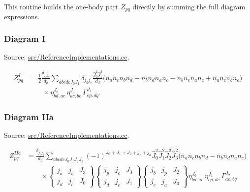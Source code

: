 \documentclass[
]{article}
\begin{document}
This routine builds the one-body part \(Z_{pq}\) directly by summing the
full diagram expressions.

\subsubsection{Diagram I}\label{diagram-i}

Source:
\href{../src/ReferenceImplementations.cc\#L6631-L6725}{src/ReferenceImplementations.cc}.

\begin{equation}
\begin{aligned}
Z^{I}_{pq}
&= \frac{1}{2}\frac{\delta_{j_p j_q}}{d_p}
\sum_{abcdeJ_0J_1}\delta_{j_dj_e}
\frac{\hat J_0^2\hat J_1^2}{d_d}
\Big(
\bar n_a\bar n_c n_b n_d
-\bar n_b\bar n_d n_a n_c
-\bar n_b\bar n_e n_a n_c
+\bar n_a\bar n_c n_b n_e
\Big) \\
&\qquad\times
\eta^{J_0}_{bd,ac}\,
\eta^{J_0}_{ac,be}\,
\Gamma^{J_1}_{ep,dq} .
\end{aligned}
\end{equation}

\subsubsection{Diagram IIa}\label{diagram-iia}

Source:
\href{../src/ReferenceImplementations.cc\#L6731-L6847}{src/ReferenceImplementations.cc}.

\begin{equation}
\begin{aligned}
Z^{IIa}_{pq}
&=\frac{\delta_{j_pj_q}}{d_p}
\sum_{abcdeJ_0J_1J_2J_3}
(-1)^{J_0+J_1+J_2+j_c+j_d}
\hat J_0^2\hat J_1^2\hat J_2^2\hat J_3^2
\Big(\bar n_a\bar n_c n_b n_d-\bar n_b\bar n_d n_a n_c\Big) \\
&\qquad\times
\begin{Bmatrix} j_a&j_b&J_3\\ j_d&j_c&J_0\end{Bmatrix}
\begin{Bmatrix} j_p&j_e&J_3\\ j_d&j_c&J_1\end{Bmatrix}
\begin{Bmatrix} j_b&j_p&J_2\\ j_e&j_a&J_3\end{Bmatrix}
\eta^{J_0}_{bd,ac}\,
\eta^{J_1}_{cp,de}\,
\Gamma^{J_2}_{ae,bq} .
\end{aligned}
\end{equation}
\end{document}
